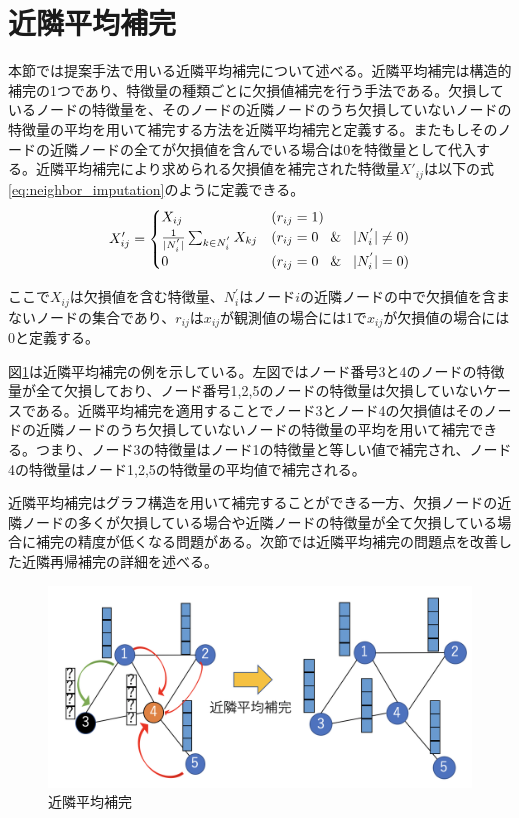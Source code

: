 \section{近隣平均補完}
本節では提案手法で用いる近隣平均補完について述べる。近隣平均補完は構造的補完の1つであり、特徴量の種類ごとに欠損値補完を行う手法である。欠損しているノードの特徴量を、そのノードの近隣ノードのうち欠損していないノードの特徴量の平均を用いて補完する方法を近隣平均補完と定義する。またもしそのノードの近隣ノードの全てが欠損値を含んでいる場合は0を特徴量として代入する。近隣平均補完により求められる欠損値を補完された特徴量$X'_{ij}$は以下の式\eqref{eq:neighbor_imputation}のように定義できる。
\begin{align} \label{eq:neighbor_imputation}
    X'_{ij} =
    \begin{cases}
      X_{ij} & (r_{ij} = 1) \\
      \frac{1}{|N^{'}_{i}|}\sum_{k\in{N^{'}_{i}}}X_{kj} & (r_{ij} = 0 \hspace{0.3cm}\& \hspace{0.3cm}|N^{'}_{i}| \neq 0) \\
      0 & (r_{ij} = 0 \hspace{0.3cm} \& \hspace{0.3cm} |N^{'}_{i}| = 0)
    \end{cases}
\end{align}

ここで$X_{ij}$は欠損値を含む特徴量、$N^{'}_{i}$はノード$i$の近隣ノードの中で欠損値を含まないノードの集合であり、$r_{ij}$は$x_{ij}$が観測値の場合には1で$x_{ij}$が欠損値の場合には0と定義する。

図\ref{fig:neighbor_imputation}は近隣平均補完の例を示している。左図ではノード番号3と4のノードの特徴量が全て欠損しており、ノード番号1,2,5のノードの特徴量は欠損していないケースである。近隣平均補完を適用することでノード3とノード4の欠損値はそのノードの近隣ノードのうち欠損していないノードの特徴量の平均を用いて補完できる。つまり、ノード3の特徴量はノード1の特徴量と等しい値で補完され、ノード4の特徴量はノード1,2,5の特徴量の平均値で補完される。

近隣平均補完はグラフ構造を用いて補完することができる一方、欠損ノードの近隣ノードの多くが欠損している場合や近隣ノードの特徴量が全て欠損している場合に補完の精度が低くなる問題がある。次節では近隣平均補完の問題点を改善した近隣再帰補完の詳細を述べる。

\begin{figure}[h]
  \centering
  \includegraphics[width=1\hsize]{figures/neighbor_imputation.png}
  \caption{近隣平均補完}
  \label{fig:neighbor_imputation}
\end{figure}

